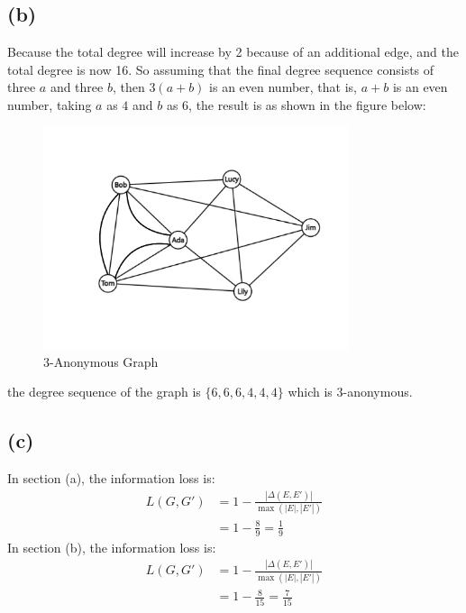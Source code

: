 \documentclass[a4paper,12pt]{article}
\begin{document}
\subsection{(b)}
Because the total degree will increase by 2 because of an additional edge, and the total degree is now 16.
So assuming that the final degree sequence consists of three $a$ and three $b$, then $3(a + b)$ is an even number, that is,
$a + b$ is an even number, taking $a$ as $4$ and $b$ as $6$, the result is as shown in the figure below:
\begin{figure}[ht]
    \centering
    \includegraphics[width=0.8\textwidth]{assets/2.png}
    \caption{3-Anonymous Graph}
\end{figure}
\newpage
the degree sequence of the graph is $\{6, 6, 6, 4, 4, 4\}$ which is 3-anonymous.

\subsection{(c)}
In section (a), the information loss is:
\begin{equation}
    \begin{aligned}
        L(G, G') & = 1 - \frac{|\Delta(E, E')|}{\max(|E|, |E'|)} \\
                 & = 1 - \frac{8}{9} = \frac{1}{9}
    \end{aligned}
\end{equation}
In section (b), the information loss is:
\begin{equation}
    \begin{aligned}
        L(G, G') & = 1 - \frac{|\Delta(E, E')|}{\max(|E|, |E'|)} \\
                 & = 1 - \frac{8}{15} = \frac{7}{15}
    \end{aligned}
\end{equation}
\end{document}
